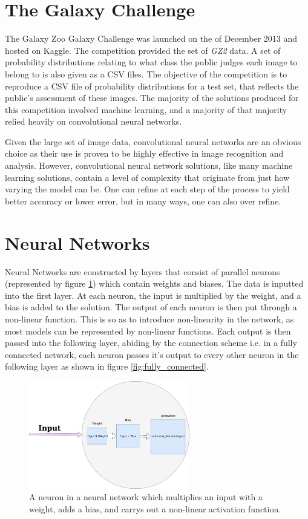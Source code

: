 \documentclass[12pt,a4paper,oneside,oldfontcommands]{memoir}
\begin{document}
\section{The Galaxy Challenge}

The Galaxy Zoo Galaxy Challenge was launched on the  of December 2013 and hosted on Kaggle. The competition provided the set of \textit{GZ2} data. A set of probability distributions relating to what class the public judges each image to belong to is also given as a CSV files. The objective of the competition is to reproduce a CSV file of probability distributions for a test set, that reflects the public's assessment of these images. The majority of the solutions produced for this competition involved machine learning, and a majority of that majority relied heavily on convolutional neural networks.

Given the large set of image data, convolutional neural networks are an obvious choice as their use is proven to be highly effective in image recognition and analysis. However, convolutional neural network solutions, like many machine learning solutions, contain a level of complexity that originate from just how varying the model can be. One can refine at each step of the process to yield better accuracy or lower error, but in many ways, one can also over refine.

\section{Neural Networks}
Neural Networks are constructed by layers that consist of parallel neurons (represented by figure \ref{fig:neuron}) which contain weights and biases. The data is inputted into the first layer. At each neuron, the input is multiplied by the weight, and a bias is added to the solution. The output of each neuron is then put through a non-linear function. This is so as to introduce non-linearity in the network, as most models can be represented by non-linear functions. Each output is then passed into the following layer, abiding by the connection scheme i.e. in a fully connected network, each neuron passes it's output to every other neuron in the following layer as shown in figure \ref{fig:fully_connected}. 

    \begin{figure}[ht]
    \center
      \includegraphics[width=7cm]{images/neuron.png}
      \caption{A neuron in a neural network which multiplies an input with a weight, adds a bias, and carrys out a non-linear activation function.}
      \label{fig:neuron}
    \end{figure}
    
\end{document}
